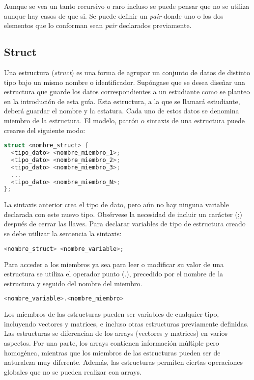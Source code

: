 Aunque se vea un tanto recursivo o raro incluso se puede pensar que no se utiliza aunque hay casos de que si. Se puede definir un \emph{pair} donde uno o los dos elementos que lo conforman sean \emph{pair} declarados previamente.

\subsection{Struct}

Una estructura (\emph{struct}) es una forma de agrupar un conjunto de datos de distinto tipo bajo un mismo
nombre o identificador. Supóngase que se desea diseñar una estructura que
guarde los datos correspondientes a un estudiante como se planteo en la introdución de esta guía. Esta estructura, a la que se llamará
estudiante, deberá guardar el nombre y la estatura. Cada uno de estos datos se denomina miembro de la estructura. El
modelo, patrón o sintaxis de una estructura puede crearse del siguiente modo:

\begin{lstlisting}[language=C++]
struct <nombre_struct> {
  <tipo_dato> <nombre_miembro_1>;
  <tipo_dato> <nombre_miembro_2>;
  <tipo_dato> <nombre_miembro_3>;
  ...
  <tipo_dato> <nombre_miembro_N>;
};
\end{lstlisting}

La sintaxis anterior crea el tipo de dato, pero aún no hay ninguna variable
declarada con este nuevo tipo. Obsérvese la necesidad de incluir un carácter (;) después de
cerrar las llaves. Para declarar variables de tipo de estructura creado se debe utilizar la sentencia
la sintaxis:

\begin{lstlisting}[language=C++]
<nombre_struct> <nombre_variable>;
\end{lstlisting}

Para acceder a los miembros ya sea para leer o modificar su valor de una estructura se utiliza el operador punto (.),
precedido por el nombre de la estructura y seguido del nombre del miembro.

\begin{lstlisting}[language=C++]
<nombre_variable>.<nombre_miembro>
\end{lstlisting}

Los miembros de las estructuras pueden ser variables de cualquier tipo, incluyendo
vectores y matrices, e incluso otras estructuras previamente definidas. Las estructuras se diferencian de los arrays (vectores y matrices) en varios aspectos. Por una parte, los arrays contienen información múltiple pero homogénea, mientras que los miembros de las estructuras pueden ser de naturaleza muy diferente. Además, las estructuras permiten ciertas operaciones globales que no se pueden realizar con arrays.

